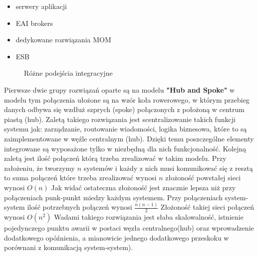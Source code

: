 \begin{itemize}
	\item serwery aplikacji
	\item EAI brokers
	\item dedykowane rozwiązania MOM
	\item ESB
\end{itemize}
\setlength\fboxsep{20pt}
\setlength\fboxrule{1pt}
\begin{figure}[!h]
	\centering
	\caption{Różne podejścia integracyjne  \cite{chappell2004}}\label{fig:podejscia_integracyjne}
\end{figure}

Pierwsze dwie grupy rozwiązań oparte są na modelu \textbf{"Hub and Spoke"}  w modelu tym połączenia ułożone są na wzór koła rowerowego, w którym przebieg danych odbywa się wzdłuż szprych (spoke) połączonych z położoną w centrum piastą (hub). Zaletą takiego rozwiązania jest scentralizowanie takich funkcji systemu jak: zarządzanie, routowanie wiadomości, logika biznesowa, które to są zaimplementowane w węźle centralnym (hub). Dzięki temu poszczególne elementy integrowane są wyposażone tylko w niezbędną dla nich funkcjonalność. Kolejną zaletą jest ilość połączeń którą trzeba zrealizować w takim modelu. Przy założeniu, że tworzymy \begin{math}n\end{math}  systemów i każdy z nich musi komunikować się z resztą to suma połączeń które trzeba zrealizować wynosi  \begin{math}n\end{math}  złożoność powstałej sieci wynosi  \begin{math}O(n)\end{math}  Jak widać ostateczna złożoność jest znacznie lepsza niż przy połączeniach punk-punkt miedzy każdym systemem. Przy połączeniach system-system  ilość potrzebnych połączeń wynosi   \begin{math}\frac{n (n- 1)}{2}\end{math}  Złożoność takiej sieci połączeń wynosi  \begin{math}O(n^2)\end{math}  Wadami takiego rozwiązania jest słaba skalowalność, istnienie pojedynczego punktu awarii w postaci węzła centralnego(hub) oraz wprowadzenie dodatkowego opóźnienia, a mianowicie jednego dodatkowego przeskoku w porównani z komunikacją system-system).

